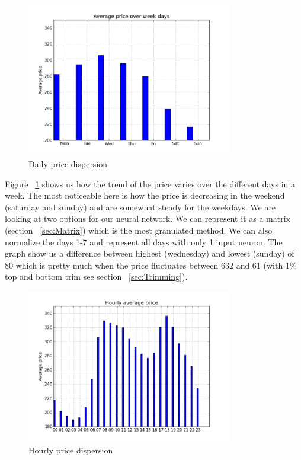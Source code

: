 \begin{figure}[H]
\centering
\includegraphics[width=0.8\textwidth ,natwidth=410,natheight=237]{billeder/energy_price_plots/Average_price_over_weekdays.png}
\caption{Daily price dispersion}
\label{fig:price_over_weekdays}
\end{figure}

Figure ~\ref{fig:price_over_weekdays} shows us how the trend of the price varies over the different days in a week. The most noticeable here is how the price is decreasing in the weekend (saturday and sunday) and are somewhat steady for the weekdays. We are looking at two options for our neural network. We can represent it as a matrix (section ~\ref{sec:Matrix}) which is the most granulated method. We can also normalize the days 1-7 and represent all days with only 1 input neuron.
The graph show us a difference between highest (wednesday) and lowest (sunday) of 80 which is pretty much when the price fluctuates between 632 and 61 (with 1\% top and bottom trim see section ~\ref{sec:Trimming}).

\begin{figure}[H]
\centering
\includegraphics[width=0.8\textwidth ,natwidth=410,natheight=237]{billeder/energy_price_plots/price_per_hour.png}
\caption{Hourly price dispersion}
\label{fig:price_per_hour}
\end{figure}

